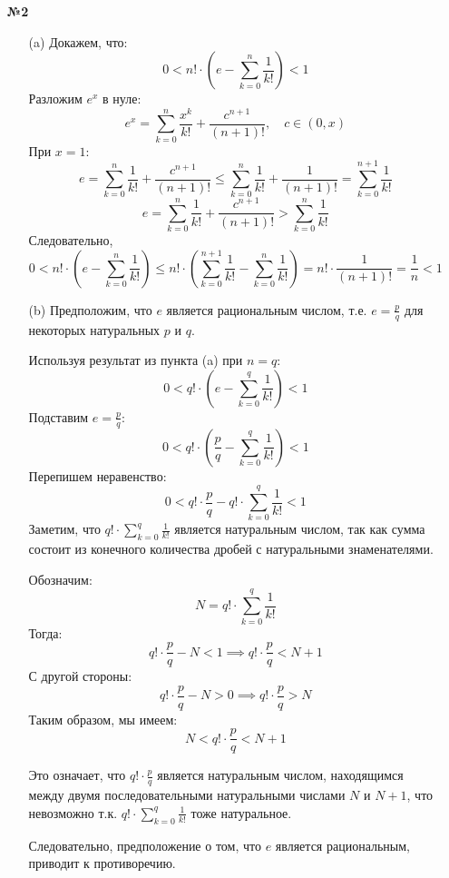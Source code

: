 \documentclass[a4paper]{article}
\renewcommand{\f}[2]{\frac{#1}{#2}}
\newcommand{\s}[2]{\sum\limits_{#1}^{#2}}
\renewcommand{\leq}{\leqslant}
\begin{document}
\begin{enumerate}
\begin{enumerate}
    \end{enumerate}

    \item[\textbf{№2}]
    \begin{enumerate}
        \item[(a)]Докажем, что:
        $$0 < n! \cdot (e - \s{k=0}{n}\f{1}{k!}) < 1$$
        Разложим $e^x$ в нуле:
        $$e^x = \s{k=0}{n}\f{x^k}{k!} + \f{c^{n+1}}{(n+1)!}, \quad c \in (0, x)$$
        При $x= 1$:
        $$e = \s{k=0}{n}\f{1}{k!} + \f{c^{n+1}}{(n+1)!} \leq \s{k=0}{n}\f{1}{k!} + \f{1}{(n+1)!} = \s{k=0}{n+1}\f{1}{k!}$$
        $$e = \s{k=0}{n}\f{1}{k!} + \f{c^{n+1}}{(n+1)!} > \s{k=0}{n}\f{1}{k!}$$
        Следовательно,
        $$0 < n! \cdot (e - \s{k=0}{n}\f{1}{k!}) \leq n! \cdot(\s{k=0}{n+1}\f{1}{k!} - \s{k=0}{n}\f{1}{k!}) = n! \cdot \f{1}{(n+1)!} = \f{1}{n} < 1$$

        \item[(b)]
        Предположим, что $ e $ является рациональным числом, т.е. $ e = \frac{p}{q} $ для некоторых натуральных $ p $ и $ q $.
        
        Используя результат из пункта (a) при $ n = q $:
        $$
        0 < q! \cdot \left( e - \sum_{k=0}^{q} \frac{1}{k!} \right) < 1
        $$
        Подставим $ e = \frac{p}{q} $:
        $$
        0 < q! \cdot \left( \frac{p}{q} - \sum_{k=0}^{q} \frac{1}{k!} \right) < 1
        $$
        Перепишем неравенство:
        $$  
        0 < q! \cdot \frac{p}{q} - q! \cdot \sum_{k=0}^{q} \frac{1}{k!} < 1
        $$
        Заметим, что $ q! \cdot \sum_{k=0}^{q} \frac{1}{k!} $ является натуральным числом, так как сумма состоит из конечного количества дробей с натуральными знаменателями.

        Обозначим:
        $$
        N = q! \cdot \sum_{k=0}^{q} \frac{1}{k!}
        $$
        Тогда:
        $$
        q! \cdot \frac{p}{q} - N < 1 \implies q! \cdot \frac{p}{q} < N + 1
        $$
        С другой стороны:
        $$
        q! \cdot \frac{p}{q} - N > 0 \implies q! \cdot \frac{p}{q} > N
        $$
        Таким образом, мы имеем:
        $$
        N < q! \cdot \frac{p}{q} < N + 1
        $$
        
        Это означает, что $ q! \cdot \frac{p}{q} $ является натуральным числом, находящимся между двумя последовательными натуральными числами $ N $ и $ N + 1 $, что невозможно т.к. $q! \cdot \sum_{k=0}^{q} \frac{1}{k!}$ тоже натуральное.

        Следовательно, предположение о том, что $ e $ является рациональным, приводит к противоречию.
                    

\end{enumerate}
\end{enumerate}
\end{document}
